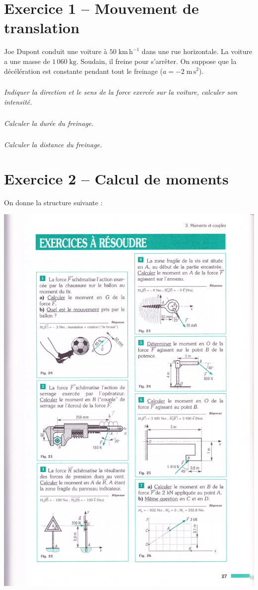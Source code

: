 \documentclass[10pt,fleqn]{book} %
\begin{document}

\vspace{7cm}
\pagestyle{fancy}
\thispagestyle{plain}


\def\columnseprulecolor{\color{ocre}}
\setlength{\columnseprule}{0.4pt} 
\begin{multicols}{2}

\section*{Exercice 1 -- Mouvement de translation}

Joe Dupont conduit une voiture à $50\; \text{km}\,\text{h}^{-1}$ dans une rue horizontale. La voiture a une masse de $1\,060\; \text{kg}$. Soudain, il freine pour s’arrêter.  On suppose que la décélération est constante pendant tout le freinage ($a = -2\; \text{m}\,\text{s}^2$).

\subparagraph{}
\textit{Indiquer la direction et le sens de la force exercée sur la voiture, calculer son intensité.}

\subparagraph{}
\textit{Calculer la durée du freinage.}

\subparagraph{}
\textit{Calculer la distance du freinage.}


\section*{Exercice 2 -- Calcul de moments}

\setcounter{subparagraph}{0}
On donne la structure suivante : 
\begin{center}
\includegraphics[width=.6\linewidth]{images/moment8}
\end{center}


\end{multicols}
\end{document}
